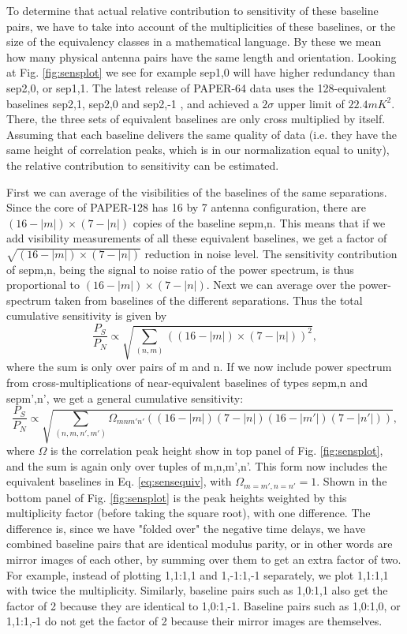 \documentclass[preprint2,numberedappendix,tighten,twocolappendix]{aastex6}  %
\renewcommand\[{\begin{equation}}
\renewcommand\]{\end{equation}}
\begin{document}
To determine that actual relative contribution to sensitivity of these
baseline pairs, we have to take into account of the multiplicities of
these baselines, or the size of the equivalency classes in a mathematical
language. By these we mean how many physical antenna pairs have the
same length and orientation. Looking at Fig. \ref{fig:sensplot}
we see for example sep1,0 will have higher redundancy than sep2,0,
or sep1,1. The latest release of PAPER-64 data uses the 128-equivalent baselines sep2,1,
sep2,0 and sep2,-1 \cite{Ali2015}, and achieved a $2\sigma$ upper
limit of $22.4mK^{2}$. There, the three sets of equivalent baselines
are only cross multiplied by itself. Assuming that each baseline delivers
the same quality of data (i.e. they have the same height of correlation
peaks, which is in our normalization equal to unity), the relative
contribution to sensitivity can be estimated. 

First we can average of the visibilities of the baselines of the same
separations. Since the core of PAPER-128 has 16 by 7 antenna configuration, there
are $(16-|m|)\times(7-|n|)$ copies of the baseline sepm,n. This means
that if we add visibility measurements of all these equivalent baselines,
we get a factor of $\sqrt{(16-|m|)\times(7-|n|)}$ reduction in noise
level. The sensitivity contribution of sepm,n, being the signal to
noise ratio of the power spectrum, is thus proportional to $(16-|m|)\times(7-|n|)$.
Next we can average over the power-spectrum taken from baselines of
the different separations. Thus the total cumulative sensitivity is
given by 
\begin{equation}
\frac{P_{S}}{P_{N}}\propto\sqrt{\sum_{(n,m)}\left((16-|m|)\times(7-|n|)\right)^{2}},\label{eq:sensequiv}
\end{equation}
where the sum is only over pairs of m and n. If we now include power
spectrum from cross-multiplications of near-equivalent baselines of
types sepm,n and sepm',n', we get a general cumulative sensitivity:
\small
\begin{equation}
\frac{P_{S}}{P_{N}}\propto\sqrt{\sum_{(n,m,n',m')}\Omega_{mnm'n'}\left((16-|m|)(7-|n|)(16-|m'|)(7-|n'|)\right)},\label{eq:sensul}
\end{equation}
\normalsize
where $\Omega$ is the correlation peak height show in top panel of Fig. \eqref{fig:sensplot},
and the sum is again only over tuples of m,n,m',n'. This form now
includes the equivalent baselines in Eq. \eqref{eq:sensequiv}, with
$\Omega_{m=m',n=n'}=1$. 
Shown in the bottom panel of Fig. \eqref{fig:sensplot} is the peak heights weighted
by this multiplicity factor (before taking the square root), with one difference. The difference is, 
since we have "folded over" the negative time delays, we have combined baseline pairs that are identical modulus parity, 
or in other words are mirror images of each other, by summing over them to get an extra factor of two. For example, 
instead of plotting 1,1:1,1 and 1,-1:1,-1 separately, we plot 1,1:1,1 with twice the multiplicity. Similarly, baseline pairs such as 
1,0:1,1 also get the factor of 2 because they are identical to 1,0:1,-1. Baseline pairs such as 1,0:1,0, or 1,1:1,-1 do not get
the factor of 2 because their mirror images are themselves. 
\end{document}
